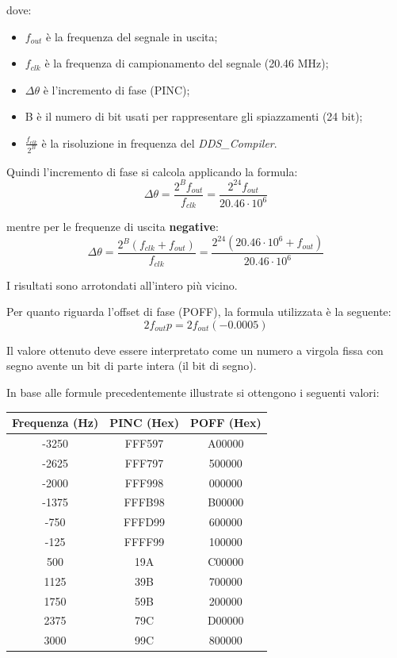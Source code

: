 \documentclass[12pt,a4paper,twoside,openany]{book}
\begin{document}
dove:
\begin{itemize}
\item $f_{out}$ è la frequenza del segnale in uscita;
\item $f_{clk}$ è la frequenza di campionamento del segnale (20.46 MHz);
\item $\Delta \theta$ è l'incremento di fase (PINC);
\item B è il numero di bit usati per rappresentare gli spiazzamenti (24 bit);
\item $\frac{f_{clk}}{2^{B}}$ è la risoluzione in frequenza del \textit{DDS\_Compiler}.
\end{itemize}

Quindi l'incremento di fase si calcola applicando la formula:
$$
	\Delta \theta = \frac{2^B f_{out}}{f_{clk}} = \frac{2^{24} f_{out}}{20.46 \cdot 10^6}
$$

mentre per le frequenze di uscita \textbf{negative}:
$$
	\Delta \theta = \frac{2^B (f_{clk} + f_{out})}{f_{clk}} = \frac{2^{24} (20.46 \cdot 10^6 + f_{out})}{20.46 \cdot 10^6}
$$

I risultati sono arrotondati all'intero più vicino.

Per quanto riguarda l'offset di fase (POFF), la formula utilizzata è la seguente:
$$
	2 f_{out} p = 2 f_{out} (-0.0005)
$$

Il valore ottenuto deve essere interpretato come un numero a virgola fissa con segno avente un bit di parte intera (il bit di segno).

In base alle formule precedentemente illustrate si ottengono i seguenti valori:\\

\begin{center}
\begin{tabular}{|c|c|c|}
\hline
\textbf{Frequenza} (Hz) & \textbf{PINC} (Hex) & \textbf{POFF} (Hex)\\ 
\hline
-3250								& FFF597					   & A00000						\\
\hline
-2625								& FFF797					   & 500000						\\
\hline
-2000								& FFF998					   & 000000						\\
\hline
-1375								& FFFB98					   & B00000						\\
\hline
-750  								& FFFD99					   & 600000						\\
\hline
-125									& FFFF99					   & 100000						\\
\hline
500									& 19A						   & C00000						\\
\hline
1125								& 39B						   & 700000						\\
\hline
1750								& 59B						   & 200000						\\
\hline
2375								& 79C						   & D00000						\\
\hline
3000								& 99C						   & 800000						\\
\hline
\end{tabular}
\end{center}
\clearpage
\end{document}
